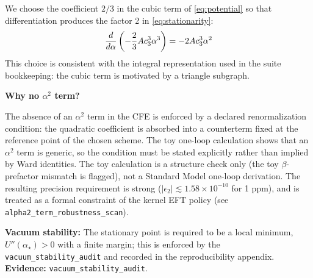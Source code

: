 We choose the coefficient $2/3$ in the cubic term of \eqref{eq:potential} so that
differentiation produces the factor 2 in \eqref{eq:stationarity}:
\begin{equation}
    \frac{d}{d\alpha}\left(-\frac{2}{3}Ac_3^3\alpha^3\right) = -2Ac_3^3\alpha^2
\end{equation}
This choice is consistent with the integral representation used in the suite
bookkeeping: the cubic term is motivated by a triangle subgraph.

\textbf{Why no $\alpha^2$ term?}

The absence of an $\alpha^2$ term in the CFE is enforced by a declared renormalization
condition: the quadratic coefficient is absorbed into a counterterm fixed at the reference
point of the chosen scheme. The toy one-loop calculation shows that an $\alpha^2$ term is
generic, so the condition must be stated explicitly rather than implied by Ward identities.
The toy calculation is a structure check only (the toy $\beta$-prefactor mismatch is flagged),
not a Standard Model one-loop derivation. The resulting precision requirement is strong
($|\epsilon_2|\lesssim 1.58\times 10^{-10}$ for 1 ppm), and is treated as a formal constraint
of the kernel EFT policy (see \texttt{alpha2\_term\_robustness\_scan}).

\textbf{Vacuum stability:} The stationary point is required to be a local minimum,
$U''(\alpha_\star)>0$ with a finite margin; this is enforced by the
\texttt{vacuum\_stability\_audit} and recorded in the reproducibility appendix.
\textbf{Evidence:} \texttt{vacuum\_stability\_audit}.

